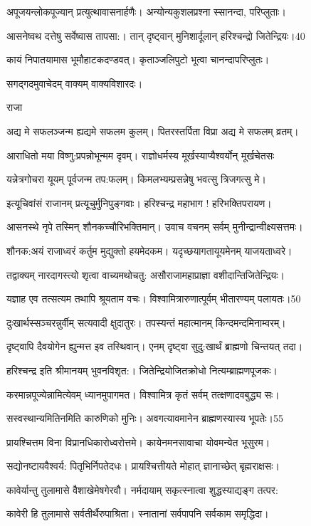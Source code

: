  अपूजयन्लोकपूज्यान् प्रत्युत्थावासनार्हणैः।
 अन्योन्यकुशलप्रश्ना स्सानन्दा, परिप्लुताः।
 
 आसनेष्वथ दत्तेषु सर्वेष्वास तापसा:।
 तान् दृष्ट्वान् मुनिशार्दूलान् हरिश्चन्द्रो जितेन्द्रियः।40

 कायं निपातयामास भूमौहाटकदण्डवत्।
 कृताञ्जलिपुटो भूत्वा चानन्दापरिप्लुतः।
 
 सगद्गदमुवाचेदम् वाक्यम् वाक्यविशारदः।
 
राजा

अद्य मे सफलञ्जन्म ह्यद्यमे सफलम कुलम्।
 पितरस्तर्पिता विप्रा अद्य मे सफलम् व्रतम्।

 आराधितो मया विष्णु:प्रपन्नोभून्मम दृवम्।
 राज्ञोधर्मस्य मूर्खस्याप्यैश्वर्योन् मूर्खचेतसः

यन्नेत्रगोचरा यूयम् पूर्वजन्म तप:फलम्।
 किमलभ्यम्प्रसन्नेषु भवत्सु त्रिजगत्सु मे।

 इत्यूचिवांसं राजानम् प्रत्यूचुर्मुनिपुङ्गवाः।
 हरिश्चन्द्र महाभाग ! हरिभक्तिपरायण।

 आसनस्थे नृपे तस्मिन् शौनकच्चौरिभक्तिमान्।
 उवाच वचनम् सर्वम् मुनीन्द्रान्वीक्ष्यसत्तमः।

 शौनक:अयं राजाध्वरं कर्तुम मुद्युक्तो हयमेदकम।
 यदृच्छयागतायूयमेनम् याजयताध्वरे।

 तद्वाक्यम् नारदागस्त्यो शृत्वा वाच्यमथोचतु:
 असौराजामहाप्राज्ञा वशीदान्तिजितेन्द्रियः।
 
 यज्ञाह एव तत्सत्यम तथापि श्रूयताम वचः।
 विश्वामित्रारुणात्पूर्वम् भीतारण्यम् पलायतः।50

  दुःखार्थस्सञ्चरन्नुर्वीम् सत्यवादी क्षुदातुरः।
 तपस्यन्तं महात्मानम् किन्दमन्दमिनाम्वरम्।
 
 दृष्ट्वापि दैवयोगेन ह्युन्मत्त इव तस्थिवान्।
 एनम् दृष्ट्वा सुदु:खार्थं ब्राह्मणो चिन्तयत् तदा।
 
 हरिश्चन्द्र इति श्रीमानयम् भुवनविशृत:।
 जितेन्द्रियोजितक्रोधो नित्यम्ब्राह्मणपूजकः।
 
 करमान्नपूज्येन्नामित्येवम् ध्यानमुपागमत।
 विश्वामित्र कृतं सर्वम् तत्क्षणादवबुद्ध्य सः।
 
 सस्वस्थान्यमितिनमिति कारुणिको मुनिः।
 अवगत्यावमानेन ब्राह्मणस्यास्य भूपतेः।55

 प्रायश्चित्तम विना विप्रानधिकारोध्वरोत्तमे।
 कायेनमनसावाचा योवमन्येत भूसुरम।
 
 सद्योनष्टायवैश्वर्य: पितृभिर्निपतेदधः।
 प्रायश्चित्तीयते मोहात् ज्ञानाच्छेत् बृह्मराक्षसः।
 
 कावेर्यान्तु तुलामासे वैशाखेमेषगेरवौ।
 नर्मदायाम् सकृत्स्नात्वा शुद्धस्याद्यङ्ग तत्पर:

 कावेरी हि तुलामासे सर्वतीर्थैरुपाश्रिता।
  स्नातानां सर्वपापनि सर्वकाम समृद्धिदा।
 
